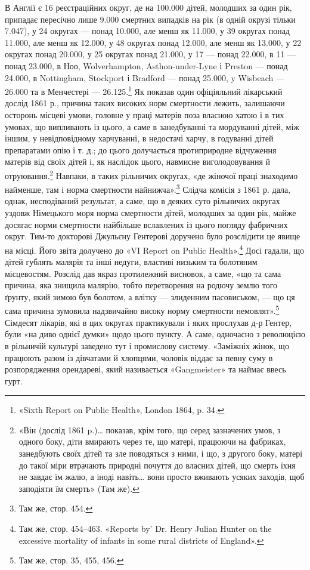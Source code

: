 \parcont{}  %
В Англії є 16 реєстраційних округ, де на 100.000 дітей, молодших
за один рік, припадає пересічно лише 9.000 смертних випадків
на рік (в одній окрузі тільки 7.047), у 24 округах — понад 10.000,
але менш як 11.000, у 39 округах понад 11.000, але менш як 12.000,
у 48 округах понад 12.000, але менш як 13.000, у 22 округах
понад 20.000, у 25 округах понад 21.000, у 17 — понад 22.000,
в 11 — понад 23.000, в Ноо, Wolverhampton, Asthon-under-Lyne
і Preston — понад 24.000, в Nottingham, Stockport і Bradford —
понад 25.000, y Wisbeach — 26.000 та в Менчестері — 26.125.\footnote{
«Sixth Report on Public Health», London 1864, p. 34.
}
Як показав один офіціяльний лікарський дослід 1861 р., причина
таких високих норм смертности лежить, залишаючи осторонь
місцеві умови, головне у праці матерів поза власною хатою і в
тих умовах, що випливають із цього, а саме в занедбуванні та
мордуванні дітей, між іншим, у невідповідному харчуванні, в
недостачі харчу, в годуванні дітей препаратами опію і т. д.;
до цього долучається протиприродне відчуження матерів від
своїх дітей і, як наслідок цього, навмисне виголодовування й
отруювання.\footnote{
«Він (дослід 1861 p.)\dots{} показав, крім того, що серед зазначених
умов, з одного боку, діти вмирають через те, що матері, працюючи на фабриках,
занедбують своїх дітей та зле поводяться з ними, і що, з другого
боку, матері до такої міри втрачають природні почуття до власних
дітей, що смерть їхня не завдає їм жалю, а іноді навіть\dots{} вони просто вживають
усяких заходів, щоб заподіяти їм смерть» (Там же).
} Навпаки, в таких рільничих округах, «де жіночої
праці знаходимо найменше, там і норма смертности найнижча».\footnote{
Там же, стор. 454.
}
Слідча комісія з 1861 р. дала, однак, несподіваний результат,
а саме, що в деяких суто рільничих округах уздовж Німецького
моря норма смертности дітей, молодших за один рік, майже
досягає норми смертности найбільше вславлених із цього погляду
фабричних округ. Тим-то докторові Джульєну Гентерові доручено
було розслідити це явище на місці. Його звіта долучено до
«VI Report on Public Health».\footnote{
Там же, стор. 454--463. «Reports by' Dr. Henry Julian Hunter
on the excessive mortality of infants in some rural districts of England».
} Досі гадали, що дітей гублять малярія
та інші недуги, властиві низьким та болотяним місцевостям.
Розслід дав якраз протилежний висновок, а саме, «що та сама
причина, яка знищила малярію, тобто перетворення на родючу
землю того ґрунту, який зимою був болотом, а влітку — злиденним
пасовиськом, — що ця сама причина зумовила надзвичайно
високу норму смертности немовлят».\footnote{
Там же, стор. 35, 455, 456.
} Сімдесят лікарів, які
в цих округах практикували і яких прослухав д-р Гентер,
були «на диво однієї думки» щодо цього пункту. А саме, одночасно
з революцією в рільничій культурі заведено тут і промислову
систему. «Заміжніх жінок, що працюють разом із дівчатами й
хлопцями, чоловік віддає за певну суму в розпорядження орендареві,
який називається «Gangmeister» та наймає ввесь гурт.
\parbreak{}  %
